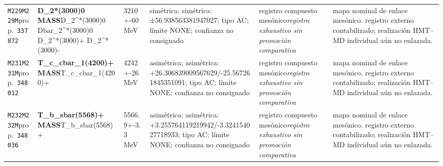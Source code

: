 \begin{landscape}
\begin{longtable}{L{1.85cm}L{4.45cm}L{2.35cm}L{4.05cm}L{3.35cm}L{7.15cm}}
\texttt{M229}\newline \texttt{M229M}\newline prop.\ \texttt{337872} & \textbf{D\_\allowbreak{}2*(3000)0 MASS}\newline D\_\allowbreak{}2\textasciicircum{}*(3000)0 \textbar{}\allowbreak{} Dbar\_\allowbreak{}2\textasciicircum{}*(3000)0 \textbar{}\allowbreak{} D\_\allowbreak{}2\textasciicircum{}*(3000)+ \textbar{}\allowbreak{} D\_\allowbreak{}2\textasciicircum{}*(3000)- & 3210+-60\,MeV & simétrica; simétrica: ±56.938563381947027; tipo AC; límite NONE; confianza no consignado & registro compuesto mesónico\newline \emph{registro exhaustivo sin promoción comparativa} & mapa nominal de enlace mesónico. registro externo contabilizado; realización HMT--MD individual aún no enlazada. \\
\texttt{M231}\newline \texttt{M231M}\newline prop.\ \texttt{348012} & \textbf{T\_\allowbreak{}c\_\allowbreak{}cbar\_\allowbreak{}1(4200)+ MASS}\newline T\_\allowbreak{}c\_\allowbreak{}cbar\_\allowbreak{}1(4200)+ & 4242+-26\,MeV & asimétrica; asimétrica: +26.306839009567629/-25.567261845351091; tipo AC; límite NONE; confianza no consignado & registro compuesto mesónico\newline \emph{registro exhaustivo sin promoción comparativa} & mapa nominal de enlace mesónico. registro externo contabilizado; realización HMT--MD individual aún no enlazada. \\
\texttt{M232}\newline \texttt{M232M}\newline prop.\ \texttt{348036} & \textbf{T\_\allowbreak{}b\_\allowbreak{}sbar(5568)+ MASS}\newline T\_\allowbreak{}b\_\allowbreak{}sbar(5568)+ & 5566.9+-3.3\,MeV & asimétrica; asimétrica: +3.255764119219942/-3.324154027718933; tipo AC; límite NONE; confianza no consignado & registro compuesto mesónico\newline \emph{registro exhaustivo sin promoción comparativa} & mapa nominal de enlace mesónico. registro externo contabilizado; realización HMT--MD individual aún no enlazada. \\

\end{longtable}
\end{landscape}
